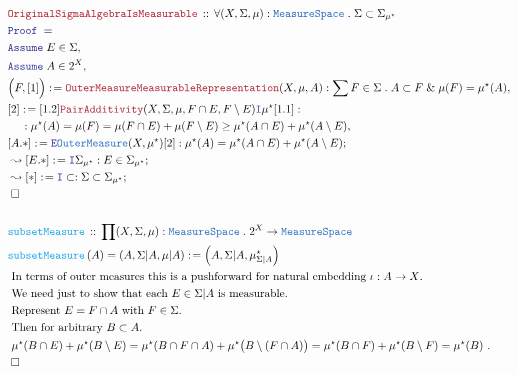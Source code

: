 \documentclass[12pt]{scrartcl}
\newcommand{\TYPE}[1]{\textcolor{NavyBlue}{\mathtt{#1}}}
\newcommand{\FUNC}[1]{\textcolor{Cerulean}{\mathtt{#1}}}
\newcommand{\LOGIC}[1]{\textcolor{Blue}{\mathtt{#1}}}
\newcommand{\THM}[1]{\textcolor{Maroon}{\mathtt{#1}}}
\renewcommand{\.}{\; . \;}
\newcommand{\de}{: \kern 0.1pc =}
\newcommand{\Act}[1]{\left( #1 \right)}
\newcommand{\Theorem}[2]{& \THM{#1} \, :: \, #2 \\ & \Proof = \\ }
\newcommand{\DeclareFunc}[2]{& \FUNC{#1} \, :: \, #2 \\}
\newcommand{\DefineNamedFunc}[4]{&  \FUNC{#1}\Act{#2} = #3 \de #4 \\}
\newcommand{\NewLine}{\\ & \kern 1pc}
\newcommand{\Page}[1]{ \begin{align*} #1 \end{align*}   }
\renewcommand{\And}{\; \& \;}
\newcommand{\Intro}{\LOGIC{I}}
\newcommand{\Elim}{\LOGIC{E}}
\newcommand{\Say}[3]{& #1 \de #2 : #3, \\}
\newcommand{\Conclude}[3]{& #1 \de #2 : #3; \\}
\newcommand{\DeriveConclude}[3]{& \leadsto #1 \de #2 : #3 ; \\}
\newcommand{\AssumeIn}[2]{& \LOGIC{Assume} \; #1 \in #2, \\}
\newcommand{\QED}{\; \square}
\newcommand{\EndProof}{& \QED \\}
\newcommand{\Proof}{\LOGIC{Proof} \; }
\newcommand{\Explain}[1]{& \text{#1.} \\}
\newcommand{\MS}{\TYPE{MeasureSpace}}
\newcommand{\OM}{\TYPE{OuterMeasure}}
\begin{document}
\Page{
	\Theorem{OriginalSigmaAlgebraIsMeasurable}
	{
		\forall (X,\Sigma,\mu) : \MS \.
		\Sigma \subset \Sigma_{\mu^\star}	
	}
	\AssumeIn{E}{\Sigma}
	\AssumeIn{A}{2^X}
	\Say{\Big(F,[1]\Big)}{\THM{OuterMeasureMeasurableRepresentation}(X,\mu,A)}
	{
		\sum F \in \Sigma \. A \subset F  \And \mu(F) = \mu^\star(A)
	}
	\Say{[2]}{ [1.2] \THM{PairAdditivity}(X,\Sigma,\mu, F \cap E, F \setminus E) \Intro \mu^\star [1.1] }
	{
		\NewLine :		
		\mu^\star(A) = \mu(F) =
		\mu(F \cap E) + \mu(F \setminus E) \ge 
		\mu^\star(A \cap E) + \mu^\star(A \setminus E) 
	}
	\Conclude{[A.*]}{\Elim \OM(X,\mu^\star)[2]}
	{\mu^\star(A) = \mu^\star(A \cap E) + \mu^\star(A \setminus E)}
	\DeriveConclude{[E.*]}{\Intro \Sigma_{\mu^\star}}{E \in \Sigma_{\mu^\star}}
	\DeriveConclude{[*]}{\Intro \subset }{\Sigma \subset \Sigma_{\mu^\star}}	
	\EndProof
	\\	
	\DeclareFunc{subsetMeasure}{\prod (X,\Sigma,\mu) : \MS \. 2^X \to \MS}
	\DefineNamedFunc{subsetMeasure}{A}{(A,\Sigma|A,\mu|A)}
	{
		\Big(A,\Sigma|A,  \mu^\star_{\Sigma|A}  \Big)
	}
	\Explain{ In terms of outer measures this is a pushforward for natural embedding 
		$\iota : A \to X$}
	\Explain{ We need just to show that each $E \in \Sigma |A$ is measurable}
	\Explain{ Represent $E = F \cap A$ with $F \in \Sigma$}
	\Explain{ Then for arbitrary $B \subset A$}
	\Explain{
		$
			\mu^\star(B \cap E) + \mu^\star(B \setminus E)  =
			\mu^\star(B \cap F \cap A) + \mu^\star\big(B \setminus (F \cap A)\big) = 
			\mu^\star(B \cap F) + \mu^\star(B \setminus F) =
			\mu^\star(B) 
		$
	}
	\EndProof
}
\newpage
\end{document}
